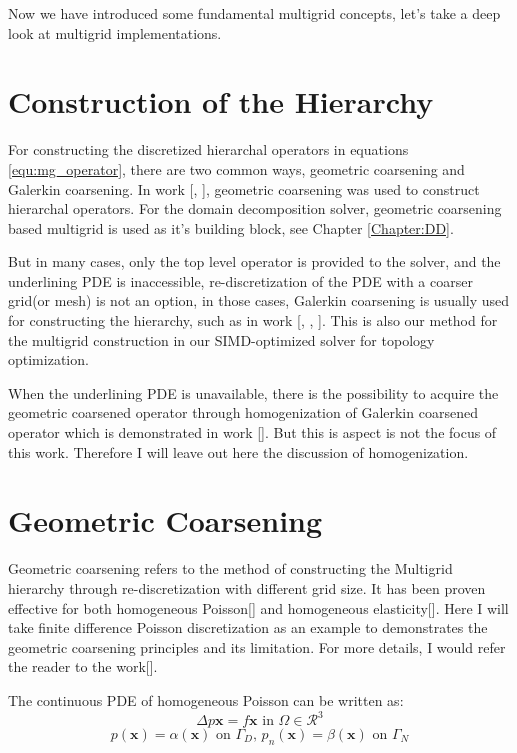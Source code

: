 Now we have introduced some fundamental multigrid concepts, let's take a deep look at multigrid implementations.
\section{Construction of the Hierarchy}
For constructing the discretized hierarchal operators in equations \ref{equ:mg_operator}, there are two common ways, geometric coarsening and Galerkin coarsening. In work [\cite{zhu2010efficient}, \cite{mcadams2010parallel}], geometric coarsening was used to construct hierarchal operators. For the domain decomposition solver, geometric coarsening based multigrid is used as it's building block, see Chapter \ref{Chapter:DD}. 

But in many cases, only the top level operator is provided to the solver, and the underlining PDE is inaccessible, re-discretization of the PDE with a coarser grid(or mesh) is not an option, in those cases, Galerkin coarsening is usually used for constructing the hierarchy, such as in work [\cite{dendy1982black}, \cite{brezina2001algebraic}, \cite{dohrmann2007interpolation}]. This is also our method for the multigrid construction in our SIMD-optimized solver for topology optimization.  

When the underlining PDE is unavailable, there is the possibility to acquire the geometric coarsened operator through homogenization of Galerkin coarsened operator which is demonstrated in work [\cite{moulton1998black}]. But this is aspect is not the focus of this work. Therefore I will leave out here the discussion of homogenization.
\section{Geometric Coarsening}
\label{sec:geo_coarsen}
Geometric coarsening refers to the method of constructing the Multigrid hierarchy through re-discretization with different grid size. It has been proven effective for both homogeneous Poisson[\cite{mcadams2010parallel}] and homogeneous elasticity[\cite{zhu2010efficient}]. Here I will take finite difference Poisson discretization as an example to demonstrates the geometric coarsening principles and its limitation. For more details, I would refer the reader to the work[\cite{mcadams2010parallel}].

The continuous PDE of homogeneous Poisson can be written as:
\begin{equation}
\Delta p\mathbf{x} = f\mathbf{x} \text{ in } \Omega \in \mathcal{R}^3
\end{equation}
$$
p(\mathbf{x}) = \alpha(\mathbf{x}) \text{ on } \Gamma_D\text{, } p_n(\mathbf{x}) = \beta(\mathbf{x}) \text{ on } \Gamma_N
$$

